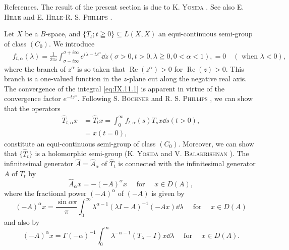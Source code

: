 References. The result of the present section is due to K. \textsc{Yosida} \cite{yosida349}. See also E. \textsc{Hille} \cite{hille99} and E. \textsc{Hille}-R. S. \textsc{Phillips} \cite{hille97}. 


\label{sec:IX.11}

Let $X$ be a $B$-space, and $\{T_t; t \geqq 0\} \subseteq L(X, X)$ an equi-continuous semi-group of class $(C_0)$. We introduce 
\begin{equation}\label{eq:IX.11.1}
\begin{aligned}
&f _{t, \alpha} (\lambda)  = \frac {1}{2 \pi i} \int_{\sigma - i \infty} ^{\sigma + i \infty} e ^ {i \lambda - t s ^{\alpha}} \dd z (\sigma > 0, t > 0, \lambda \geqq 0, 0 < \alpha < 1), = 0 \quad (\text{ when } \lambda < 0),
\end{aligned}
\end{equation}
where the branch of $z^{\alpha}$ is so taken that $\operatorname{Re}(z^{\alpha}) > 0$ for $\operatorname{Re}(z) > 0$. This branch is a one-valued function in the $z$-plane cut along the negative real axis. The convergence of the integral \eqref{eq:IX.11.1} is apparent in virtue of the convergence factor $e^{-tz^{\alpha}}$. Following S. \textsc{Bochner} \cite{bochner21} and R. S. \textsc{Phillips} \cite{phillips255}, we can show that the operators 
\begin{equation}\label{eq:IX.11.2}
\begin{aligned} \hat {T} _{t, \alpha} x & = \hat {T} _{t} x = \int_{0} ^{\infty} f _{t, \alpha} (s) T _{s} x \dd s (t > 0), \\ & = x (t = 0), \end{aligned}
\end{equation}
constitute an equi-continuous semi-group of class $(C_{0})$. Moreover, we can show that $\{\hat{T}_{t}\}$ is a holomorphic semi-group (K. \textsc{Yosida} \cite{yosida351} and V. \textsc{Balakrishnan} \cite{balakrishnan8}). The infinitesimal generator $\hat{A} = \hat{A}_{\alpha}$ of $\hat{T}_{t}$ is connected with the infinitesimal generator $A$ of $T_{t}$ by 
\begin{equation}\label{eq:IX.11.3}
\hat {A} _{\alpha} x = - (- A) ^{\alpha} x \quad \text{ for } \quad x \in D (A),
\end{equation}
where the fractional power $(-A)^{\alpha}$ of $(-A)$ is given by 
\begin{equation}\label{eq:IX.11.4}
(- A) ^{\alpha} x = \frac {\sin \alpha \pi}{\pi} \int_{0} ^{\infty} \lambda^{\alpha -1} (\lambda I - A) ^{-1} (- A x) \dd \lambda \quad \text{ for } \quad x \in D (A)
\end{equation}
and also by 
\begin{equation}\label{eq:IX.11.5}
(- A) ^{\alpha} x = \Gamma (- \alpha) ^{-1} \int_{0} ^{\infty} \lambda^{- \alpha -1} (T _{\lambda} - I) x \dd \lambda \quad \text{ for } \quad x \in D (A).
\end{equation}

